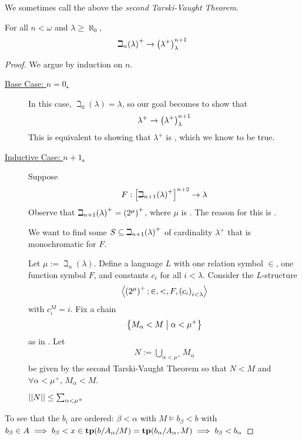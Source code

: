 We sometimes call the above the \textit{second Tarski-Vaught Theorem}.

\begin{boxtheorem}
    For all $n < \omega$ and $\lambda \geq \aleph_0$,
    \begin{align*}
        \beth_n\!\left( \lambda \right)^+ \to \left( \lambda^+ \right)_{\lambda}^{n + 1}
    \end{align*}
\end{boxtheorem}
\begin{proof}
    We argue by induction on $n$.

    \begin{description}
        \item[\underline{Base Case: $n = 0$.}]
        In this case, $\beth_0(\lambda) = \lambda$, so our goal becomes to show that
        \begin{align*}
            \lambda^+ \to \left( \lambda^+ \right)_{\lambda}^{n + 1}
        \end{align*}
        This is equivalent to showing that $\lambda^+$ is \sorry, which we know to be true.

        \item[\underline{Inductive Case: $n + 1$.}]
        Suppose
        \begin{align*}
            F : \left[ \beth_{n+1}\!\left( \lambda \right)^+ \right]^{n + 2} \to \lambda
        \end{align*}
        Observe that $\beth_{n+1}\!\left( \lambda \right)^+ = \left( 2^{\mu} \right)^+$, where $\mu$ is \sorry. The reason for this is \sorry.

        We want to find some $S \subseteq \beth_{n+1}\!\left( \lambda \right)^+$ of cardinality $\lambda^+$ that is monochromatic for $F$.

        Let $\mu := \beth_n(\lambda)$. Define a language $L$ with one relation symbol $\in$, one function symbol $F$, and constants $c_i$ for all $i < \lambda$. Consider the $L$-structure
        \begin{align*}
            \left\langle \left( 2^{\mu} \right)^+; \in, <, F, \left( c_i \right)_{i < \lambda} \right\rangle
        \end{align*}
        with $c_i^M = i$. Fix a chain
        \begin{align*}
            \left\{ M_{\alpha} < M \; \middle\vert \; \alpha < \mu^+ \right\}
        \end{align*}
        as in . Let
        \begin{align*}
            N := \bigcup_{\alpha < \mu^+} M_{\alpha}
        \end{align*}
        be given by the second Tarski-Vaught Theorem so that $N < M$ and $\forall \alpha < \mu^+$, $M_{\alpha} < M$.

        $\left\lvert \left\lvert N \right\rvert \right\rvert \leq \sum_{\alpha < \mu^+}$
    \end{description}
    To see that the $b_i$ are ordered: $\beta <\alpha$ with $M\models b_{\beta}<b$ with $b_{\beta}\in A\implies b_{\beta}<x\in \mathbf{tp}(b/A_{\alpha}/M)=\textbf{tp}(b_{\alpha}/A_{\alpha},M)\implies b_{\beta}<b_{\alpha}$
\end{proof}